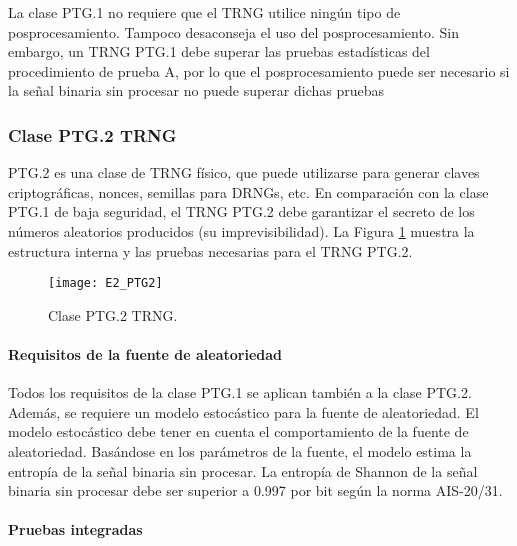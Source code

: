                 La clase PTG.1 no requiere que el TRNG utilice ningún tipo de posprocesamiento. Tampoco desaconseja el uso del posprocesamiento. Sin embargo, un TRNG PTG.1 debe superar las pruebas estadísticas del procedimiento de prueba A, por lo que el posprocesamiento puede ser necesario si la señal binaria sin procesar no puede superar dichas pruebas

            \subsubsection{Clase PTG.2 TRNG}
            
                PTG.2 es una clase de TRNG físico, que puede utilizarse para generar claves criptográficas, nonces, semillas para DRNGs, etc. En comparación con la clase PTG.1 de baja seguridad, el TRNG PTG.2 debe garantizar el secreto de los números aleatorios producidos (su imprevisibilidad). La Figura \ref{fig:E2_PTG2} muestra la estructura interna y las pruebas necesarias para el TRNG PTG.2.

                \begin{figure}[hbtp]
                    \caption{Clase PTG.2 TRNG.}
                    \centering
                    \texttt{[image: E2\_PTG2]}
                    \label{fig:E2_PTG2}
                \end{figure}
            
                \paragraph{Requisitos de la fuente de aleatoriedad\\}
                
                Todos los requisitos de la clase PTG.1 se aplican también a la clase PTG.2. Además, se requiere un modelo estocástico para la fuente de aleatoriedad. El modelo estocástico debe tener en cuenta el comportamiento de la fuente de aleatoriedad. Basándose en los parámetros de la fuente, el modelo estima la entropía de la señal binaria sin procesar. La entropía de Shannon de la señal binaria sin procesar debe ser superior a 0.997 por bit según la norma AIS-20/31.
                
                \paragraph{Pruebas integradas\\}
                
